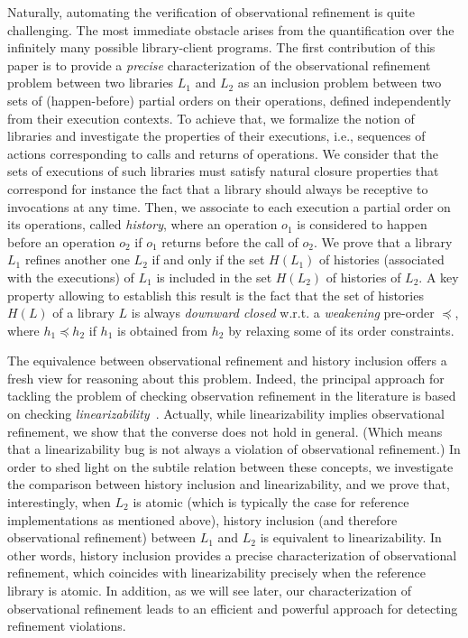 Naturally, automating the verification of observational refinement is quite challenging. The most immediate obstacle arises from the quantification over the infinitely many possible library-client programs. The first contribution of this paper is to provide a {\em precise} characterization of the observational refinement problem between two libraries $L_1$ and $L_2$ as an inclusion problem between two sets of (happen-before) partial orders on their operations, defined independently from their execution contexts. To achieve that, we formalize the notion of  libraries and investigate the properties of their executions, i.e., sequences of  actions corresponding to calls and returns of operations. We consider that the sets of executions of such libraries must satisfy natural closure properties that correspond for instance the fact that a library should always be receptive to invocations at any time.
Then, we associate to each execution a partial order on its operations, called {\em history}, where an operation $o_1$ is considered to happen before an operation $o_2$ if $o_1$ returns before the call of $o_2$. We prove that a library $L_1$ refines another one $L_2$ if and only if the set $H(L_1)$ of histories (associated with the executions) of $L_1$ is included in the set $H(L_2)$ of histories of $L_2$. A key property allowing to establish this result is the fact that the set of histories $H(L)$ of a library $L$ is always {\em downward closed} w.r.t. a {\em weakening} pre-order $\preceq$, where $h_1 \preceq h_2$ if $h_1$ is obtained from $h_2$ by relaxing some of its order constraints. 

The equivalence between observational refinement and history inclusion offers a fresh view for reasoning about this problem. Indeed, the principal approach for tackling the problem of checking observation refinement in the literature is based on checking \emph{linearizability}~\cite{}. Actually, while linearizability implies observational refinement, we show that the converse does not hold in general. (Which means that a linearizability bug is not always a violation of observational refinement.) In order to shed light on the subtile relation between these concepts, we investigate the comparison between history inclusion and linearizability, and we prove that, interestingly, when $L_2$ is atomic (which is typically the case for reference implementations as mentioned above), history inclusion  (and therefore observational refinement) between $L_1$ and $L_2$ is equivalent to linearizability. 
In other words, history inclusion provides a precise  characterization of observational refinement, which coincides with linearizability precisely when the reference library is atomic. In addition, as we will see later, our characterization of observational refinement leads to an efficient and powerful approach for detecting refinement violations. 

